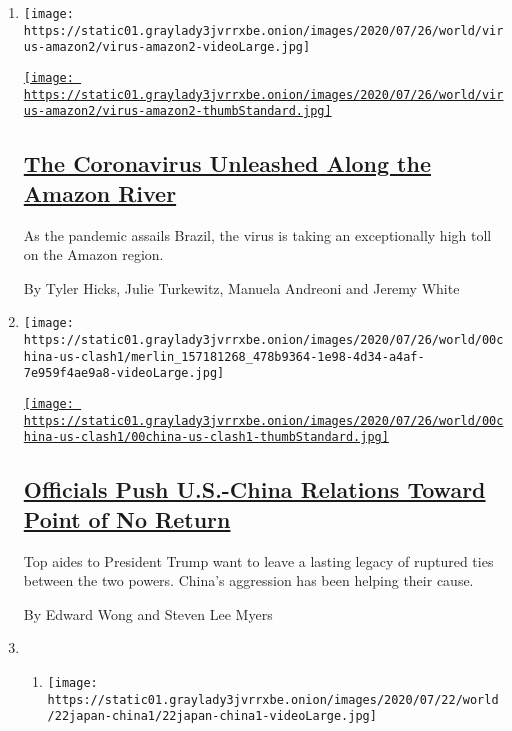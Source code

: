 \begin{enumerate}
\def\labelenumi{\arabic{enumi}.}
\item
  \texttt{[image: https://static01.graylady3jvrrxbe.onion/images/2020/07/26/world/virus-amazon2/virus-amazon2-videoLarge.jpg]}

  \href{/interactive/2020/07/25/world/americas/coronavirus-brazil-amazon.html}{\texttt{[image: https://static01.graylady3jvrrxbe.onion/images/2020/07/26/world/virus-amazon2/virus-amazon2-thumbStandard.jpg]}}

  \hypertarget{the-coronavirus-unleashed-along-the-amazon-river}{%
  \subsection{\texorpdfstring{\href{/interactive/2020/07/25/world/americas/coronavirus-brazil-amazon.html}{The
  Coronavirus Unleashed Along the Amazon
  River}}{The Coronavirus Unleashed Along the Amazon River}}\label{the-coronavirus-unleashed-along-the-amazon-river}}

  As the pandemic assails Brazil, the virus is taking an exceptionally
  high toll on the Amazon region.

  By Tyler Hicks, Julie Turkewitz, Manuela Andreoni and Jeremy White
\item
  \texttt{[image: https://static01.graylady3jvrrxbe.onion/images/2020/07/26/world/00china-us-clash1/merlin\_157181268\_478b9364-1e98-4d34-a4af-7e959f4ae9a8-videoLarge.jpg]}

  \href{/2020/07/25/world/asia/us-china-trump-xi.html}{\texttt{[image: https://static01.graylady3jvrrxbe.onion/images/2020/07/26/world/00china-us-clash1/00china-us-clash1-thumbStandard.jpg]}}

  \hypertarget{officials-push-us-china-relations-toward-point-of-no-return}{%
  \subsection{\texorpdfstring{\href{/2020/07/25/world/asia/us-china-trump-xi.html}{Officials
  Push U.S.-China Relations Toward Point of No
  Return}}{Officials Push U.S.-China Relations Toward Point of No Return}}\label{officials-push-us-china-relations-toward-point-of-no-return}}

  Top aides to President Trump want to leave a lasting legacy of
  ruptured ties between the two powers. China's aggression has been
  helping their cause.

  By Edward Wong and Steven Lee Myers
\item
  \begin{enumerate}
  \def\labelenumii{\arabic{enumii}.}
  \item
    \texttt{[image: https://static01.graylady3jvrrxbe.onion/images/2020/07/22/world/22japan-china1/22japan-china1-videoLarge.jpg]}


\end{enumerate}
\end{enumerate}
